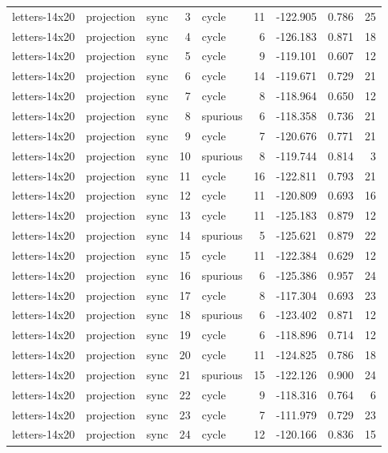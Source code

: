 \begin{tabular}{lllrlrrrr}
letters-14x20 & projection & sync & 3 & cycle & 11 & -122.905 & 0.786 & 25 \\
letters-14x20 & projection & sync & 4 & cycle & 6 & -126.183 & 0.871 & 18 \\
letters-14x20 & projection & sync & 5 & cycle & 9 & -119.101 & 0.607 & 12 \\
letters-14x20 & projection & sync & 6 & cycle & 14 & -119.671 & 0.729 & 21 \\
letters-14x20 & projection & sync & 7 & cycle & 8 & -118.964 & 0.650 & 12 \\
letters-14x20 & projection & sync & 8 & spurious & 6 & -118.358 & 0.736 & 21 \\
letters-14x20 & projection & sync & 9 & cycle & 7 & -120.676 & 0.771 & 21 \\
letters-14x20 & projection & sync & 10 & spurious & 8 & -119.744 & 0.814 & 3 \\
letters-14x20 & projection & sync & 11 & cycle & 16 & -122.811 & 0.793 & 21 \\
letters-14x20 & projection & sync & 12 & cycle & 11 & -120.809 & 0.693 & 16 \\
letters-14x20 & projection & sync & 13 & cycle & 11 & -125.183 & 0.879 & 12 \\
letters-14x20 & projection & sync & 14 & spurious & 5 & -125.621 & 0.879 & 22 \\
letters-14x20 & projection & sync & 15 & cycle & 11 & -122.384 & 0.629 & 12 \\
letters-14x20 & projection & sync & 16 & spurious & 6 & -125.386 & 0.957 & 24 \\
letters-14x20 & projection & sync & 17 & cycle & 8 & -117.304 & 0.693 & 23 \\
letters-14x20 & projection & sync & 18 & spurious & 6 & -123.402 & 0.871 & 12 \\
letters-14x20 & projection & sync & 19 & cycle & 6 & -118.896 & 0.714 & 12 \\
letters-14x20 & projection & sync & 20 & cycle & 11 & -124.825 & 0.786 & 18 \\
letters-14x20 & projection & sync & 21 & spurious & 15 & -122.126 & 0.900 & 24 \\
letters-14x20 & projection & sync & 22 & cycle & 9 & -118.316 & 0.764 & 6 \\
letters-14x20 & projection & sync & 23 & cycle & 7 & -111.979 & 0.729 & 23 \\
letters-14x20 & projection & sync & 24 & cycle & 12 & -120.166 & 0.836 & 15 \\

\end{tabular}
